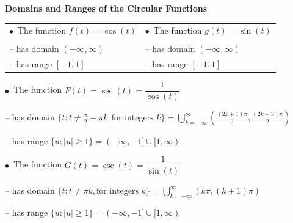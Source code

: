 \smallskip

\colorbox{ResultColor}{\bbm

\begin{thm} \label{circularfunctionsdomainrange}  \textbf{Domains and Ranges of the Circular Functions} 

\vspace{.2in}

\begin{tabular}{ll}

\hspace{.3in} $\bullet \, $ The function $f(t) = \cos(t)$ & \hspace{.8in} $\bullet \, $ The function $g(t) = \sin(t)$ \\
  & \\
\hspace{.5in} -- has domain $(-\infty, \infty)$ & \hspace{1in} -- has domain $(-\infty, \infty)$ \\ [4pt]
\hspace{.5in} -- has range $[-1,1]$ & \hspace{1in} -- has range $[-1,1]$ \\ [4pt]

\end{tabular}

\hspace{.3in} $\bullet \, $ The function $F(t) = \sec(t) = \dfrac{1}{\cos(t)}$ 

\hspace{.5in} -- has domain $\{ t : t \neq  \frac{\pi}{2} + \pi k, \text{for integers $k$} \}  = \displaystyle{\bigcup_{k = -\infty}^{\infty} \left( \frac{(2k+1)\pi}{2}, \frac{(2k+3) \pi}{2} \right)}$ 

\hspace{.5in} -- has range $\{ u : |u| \geq 1 \} =  (-\infty, -1] \cup [1, \infty) $ 

\medskip

\hspace{.3in} $\bullet \, $ The function $G(t) = \csc(t) = \dfrac{1}{\sin(t)}$

\hspace{.5in} -- has domain $\{ t : t \neq \pi k, \text{for integers $k$} \}  = \displaystyle{\bigcup_{k = -\infty}^{\infty} \left(k \pi ,(k+1) \pi \right)}$ 

\hspace{.5in} -- has range $\{ u : |u| \geq 1 \} =  (-\infty, -1] \cup [1, \infty) $ 

\medskip


\end{thm}}
